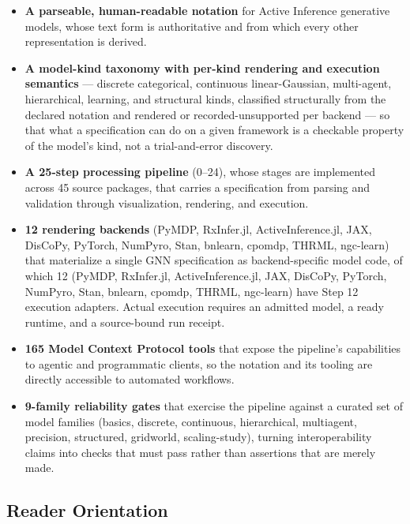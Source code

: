 \documentclass[
  english,
  9pt,
]{extarticle}
\providecommand{\tightlist}{%
  \setlength{\itemsep}{0pt}\setlength{\parskip}{0pt}}
\begin{document}
\begin{itemize}
\tightlist
\item
  \textbf{A parseable, human-readable notation} for Active Inference
  generative models, whose text form is authoritative and from which
  every other representation is derived.
\item
  \textbf{A model-kind taxonomy with per-kind rendering and execution
  semantics} --- discrete categorical, continuous linear-Gaussian,
  multi-agent, hierarchical, learning, and structural kinds, classified
  structurally from the declared notation and rendered or
  recorded-unsupported per backend --- so that what a specification can
  do on a given framework is a checkable property of the model's kind,
  not a trial-and-error discovery.
\item
  \textbf{A 25-step processing pipeline} (0--24), whose stages are
  implemented across 45 source packages, that carries a specification
  from parsing and validation through visualization, rendering, and
  execution.
\item
  \textbf{12 rendering backends} (PyMDP, RxInfer.jl, ActiveInference.jl,
  JAX, DisCoPy, PyTorch, NumPyro, Stan, bnlearn, cpomdp, THRML,
  ngc-learn) that materialize a single GNN specification as
  backend-specific model code, of which 12 (PyMDP, RxInfer.jl,
  ActiveInference.jl, JAX, DisCoPy, PyTorch, NumPyro, Stan, bnlearn,
  cpomdp, THRML, ngc-learn) have Step 12 execution adapters. Actual
  execution requires an admitted model, a ready runtime, and a
  source-bound run receipt.
\item
  \textbf{165 Model Context Protocol tools} that expose the pipeline's
  capabilities to agentic and programmatic clients, so the notation and
  its tooling are directly accessible to automated workflows.
\item
  \textbf{9-family reliability gates} that exercise the pipeline against
  a curated set of model families (basics, discrete, continuous,
  hierarchical, multiagent, precision, structured, gridworld,
  scaling-study), turning interoperability claims into checks that must
  pass rather than assertions that are merely made.
\end{itemize}

\subsection{Reader Orientation}\label{reader-orientation}
\end{document}
